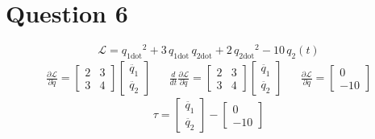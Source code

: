 \documentclass[11pt]{article}
\begin{document}
\section*{Question 6}
$$\mathcal{L} ={q_{\mathrm{1dot}}}^2+3\,q_{\mathrm{1dot}}\,q_{\mathrm{2dot}}+2\,{q_{\mathrm{2dot}}}^2-10\,q_{2}\left(t\right)$$ 
\begin{align*}
    \frac{\partial\mathcal{L}}{\partial \dot{q}}=
    \begin{bmatrix} 2 & 3\\3 & 4 \end{bmatrix}
    \begin{bmatrix} \ddot{q_1}\\\ddot{q_2}\end{bmatrix}
        &        & 
        \frac{d}{dt}\frac{\partial\mathcal{L}}{\partial \dot{q}}=
    \begin{bmatrix} 2 & 3\\3 & 4 \end{bmatrix}
    \begin{bmatrix} \ddot{q_1}\\\ddot{q_2}\end{bmatrix}
        &        & 
        \frac{\partial\mathcal{L}}{\partial q}=
    \begin{bmatrix} 0\\-10 \end{bmatrix}
\end{align*}
$$\tau =
    \begin{bmatrix} \ddot{q_1}\\\ddot{q_2}\end{bmatrix} -
    \begin{bmatrix} 0\\-10 \end{bmatrix}
$$
\begin{align*}
\end{align*}
\end{document}
